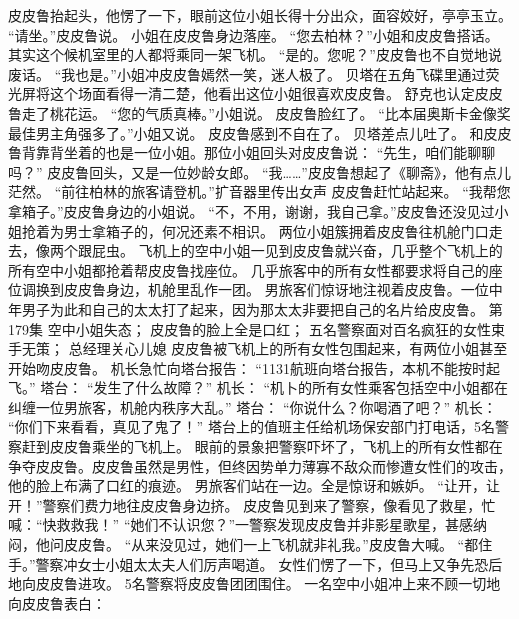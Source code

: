 \documentclass[a4paper,12pt,UTF8,twoside]{ctexbook}
\begin{document}
        皮皮鲁抬起头，他愣了一下，眼前这位小姐长得十分出众，面容姣好，亭亭玉立。 
        “请坐。”皮皮鲁说。 
        小姐在皮皮鲁身边落座。 
        “您去柏林？”小姐和皮皮鲁搭话。其实这个候机室里的人都将乘同一架飞机。 
        “是的。您呢？”皮皮鲁也不自觉地说废话。 
        “我也是。”小姐冲皮皮鲁嫣然一笑，迷人极了。 
        贝塔在五角飞碟里通过荧光屏将这个场面看得一清二楚，他看出这位小姐很喜欢皮皮鲁。 
        舒克也认定皮皮鲁走了桃花运。 
        “您的气质真棒。”小姐说。 
        皮皮鲁脸红了。 
        “比本届奥斯卡金像奖最佳男主角强多了。”小姐又说。 
        皮皮鲁感到不自在了。 
        贝塔差点儿吐了。 
        和皮皮鲁背靠背坐着的也是一位小姐。那位小姐回头对皮皮鲁说： 
        “先生，咱们能聊聊吗？” 
        皮皮鲁回头，又是一位妙龄女郎。 
        “我……”皮皮鲁想起了《聊斋》，他有点儿茫然。 
        “前往柏林的旅客请登机。”扩音器里传出女声 
         皮皮鲁赶忙站起来。 
        “我帮您拿箱子。”皮皮鲁身边的小姐说。 
        “不，不用，谢谢，我自己拿。”皮皮鲁还没见过小姐抢着为男士拿箱子的，何况还素不相识。 
        两位小姐簇拥着皮皮鲁往机舱门口走去，像两个跟屁虫。 
        飞机上的空中小姐一见到皮皮鲁就兴奋，几乎整个飞机上的所有空中小姐都抢着帮皮皮鲁找座位。 
        几乎旅客中的所有女性都要求将自己的座位调换到皮皮鲁身边，机舱里乱作一团。 
        男旅客们惊讶地注视着皮皮鲁。一位中年男子为此和自己的太太打了起来，因为那太太非要把自己的名片给皮皮鲁。   第179集 
        空中小姐失态； 
        皮皮鲁的脸上全是口红； 
        五名警察面对百名疯狂的女性束手无策； 
        总经理关心儿媳   
        皮皮鲁被飞机上的所有女性包围起来，有两位小姐甚至开始吻皮皮鲁。 
        机长急忙向塔台报告： 
        “1131航班向塔台报告，本机不能按时起飞。” 
        塔台： 
        “发生了什么故障？” 
        机长： 
        “机卜的所有女性乘客包括空中小姐都在纠缠一位男旅客，机舱内秩序大乱。” 
        塔台： 
        “你说什么？你喝酒了吧？” 
        机长： 
        “你们下来看看，真见了鬼了！” 
        塔台上的值班主任给机场保安部门打电话，5名警察赶到皮皮鲁乘坐的飞机上。 
        眼前的景象把警察吓坏了，飞机上的所有女性都在争夺皮皮鲁。皮皮鲁虽然是男性，但终因势单力薄寡不敌众而惨遭女性们的攻击，他的脸上布满了口红的痕迹。 
        男旅客们站在一边。全是惊讶和嫉妒。 
        “让开，让开！”警察们费力地往皮皮鲁身边挤。 
        皮皮鲁见到来了警察，像看见了救星，忙喊：“快救救我！” 
        “她们不认识您？”一警察发现皮皮鲁并非影星歌星，甚感纳闷，他问皮皮鲁。 
        “从来没见过，她们一上飞机就非礼我。”皮皮鲁大喊。 
        “都住手。”警察冲女士小姐太太夫人们厉声喝道。 
        女性们愣了一下，但马上又争先恐后地向皮皮鲁进攻。 
        5名警察将皮皮鲁团团围住。 
        一名空中小姐冲上来不顾一切地向皮皮鲁表白： 
\end{document}

